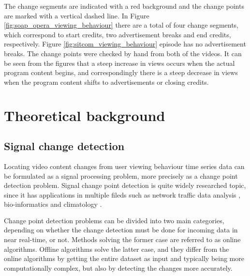 The change segments are indicated with a red background and the change points are marked with a vertical dashed line. In Figure \ref{fig:soap_opera_viewing_behaviour} there are a total of four change segments, which correspond to start credits, two advertisement breaks and end credits, respectively. Figure \ref{fig:sitcom_viewing_behaviour} episode has no advertisement breaks. The change points were checked by hand from both of the videos. It can be seen from the figures that a steep increase in views occurs when the actual program content begins, and correspondingly there is a steep decrease in views when the program content shifts to advertisements or closing credits.
\newpage
\section{Theoretical background} \label{sec:background}

\subsection{Signal change detection} \label{subsec:methods} %


Locating video content changes from user viewing behaviour time series data can be formulated as a signal processing problem, more precisely as a change point detection problem. Signal change point detection is quite widely researched topic, since it has applications in multiple fileds such as network traffic data analysis \cite{levy-leducDetectionLocalizationChangepoints2009} \cite{lung-yut-fongDistributedDetectionLocalization2012}, bio-informatics \cite{liuChangepointDetectionMethod2018} \cite{vertFastDetectionMultiple2010} and climatology \cite{reevesReviewComparisonChangepoint2007} \cite{verbesseltDetectingTrendSeasonal2010a}.

Change point detection problems can be divided into two main categories, depending on whether the change detection must be done for incoming data in near real-time, or not. Methods solving the former case are referred to as online algorithms. Offline algorithms solve the latter case, and they differ from the online algorithms by getting the entire dataset as input and typically being more computationally complex, but also by detecting the changes more accurately.

